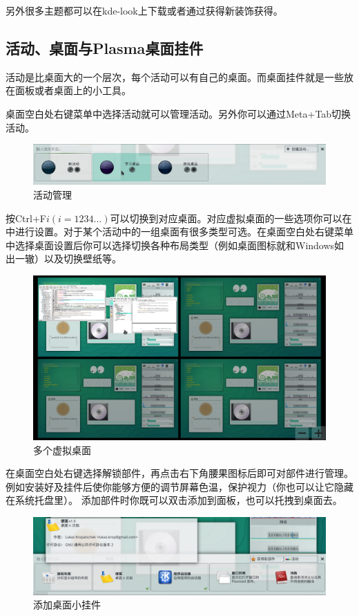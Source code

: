 另外很多主题都可以在kde-look上下载或者通过获得新装饰获得。
\subsection{活动、桌面与Plasma桌面挂件}
活动是比桌面大的一个层次，每个活动可以有自己的桌面。而桌面挂件就是一些放在面板或者桌面上的小工具。

桌面空白处右键菜单中选择活动就可以管理活动。另外你可以通过Meta+Tab切换活动。
\begin{figure}[htbp!]
\centering
\includegraphics[width=\textwidth]{./pic/activity.png} 
\caption{活动管理}\label{activity}
\end{figure}

按Ctrl+F$i(i=1234\ldots)$可以切换到对应桌面。对应虚拟桌面的一些选项你可以在\me{}中进行设置。对于某个活动中的一组桌面有很多类型可选。在桌面空白处右键菜单中选择桌面设置后你可以选择切换各种布局类型（例如桌面图标就和Windows如出一辙）以及切换壁纸等。
\begin{figure}[htbp!]
\centering
\includegraphics[width=\textwidth]{./pic/virtualdesk.png} 
\caption{多个虚拟桌面}\label{multidesk}
\end{figure}

在桌面空白处右键选择解锁部件，再点击右下角腰果图标后即可对部件进行管理。例如安装好及挂件后使你能够方便的调节屏幕色温，保护视力（你也可以让它隐藏在系统托盘里）。
添加部件时你既可以双击添加到面板，也可以托拽到桌面去。
\begin{figure}[htbp!]
\centering
\includegraphics[width=\textwidth]{./pic/plasma.png} 
\caption{添加桌面小挂件}\label{plasma}
\end{figure}

